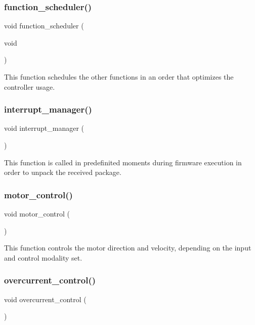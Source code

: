 \subsubsection{function\+\_\+scheduler()}
{\footnotesize\ttfamily void function\+\_\+scheduler (\begin{DoxyParamCaption}\item[{void}]{ }\end{DoxyParamCaption})}

This function schedules the other functions in an order that optimizes the controller usage. \mbox{\label{interruptions_8h_a9790811526002d99b25a814afd02cbae}} 
\subsubsection{interrupt\+\_\+manager()}
{\footnotesize\ttfamily void interrupt\+\_\+manager (\begin{DoxyParamCaption}{ }\end{DoxyParamCaption})}

This function is called in predefinited moments during firmware execution in order to unpack the received package. \mbox{\label{interruptions_8h_a8c7c487a5a127331b0de53443e3ca964}} 
\subsubsection{motor\+\_\+control()}
{\footnotesize\ttfamily void motor\+\_\+control (\begin{DoxyParamCaption}{ }\end{DoxyParamCaption})}

This function controls the motor direction and velocity, depending on the input and control modality set. \mbox{\label{interruptions_8h_a4e92908805632dc8cab2936d89bb3ba1}} 
\subsubsection{overcurrent\+\_\+control()}
{\footnotesize\ttfamily void overcurrent\+\_\+control (\begin{DoxyParamCaption}{ }\end{DoxyParamCaption})}

